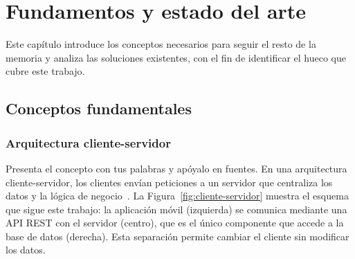 \chapter{Fundamentos y estado del arte}
\label{cap:estado}

Este capítulo introduce los conceptos necesarios para seguir el resto de la
memoria y analiza las soluciones existentes, con el fin de identificar el hueco
que cubre este trabajo.

\section{Conceptos fundamentales}
\label{sec:conceptos}

\subsection{Arquitectura cliente-servidor}
\label{sec:cliente-servidor}

Presenta el concepto con tus palabras y apóyalo en fuentes. En una arquitectura
cliente-servidor, los clientes envían peticiones a un servidor que centraliza
los datos y la lógica de negocio~\cite{martin2022arquitectura}. La
Figura~\ref{fig:cliente-servidor} muestra el esquema que sigue este trabajo: la
aplicación móvil (izquierda) se comunica mediante una \ac{API} \ac{REST} con el
servidor (centro), que es el único componente que accede a la base de datos
(derecha). Esta separación permite cambiar el cliente sin modificar los datos.

